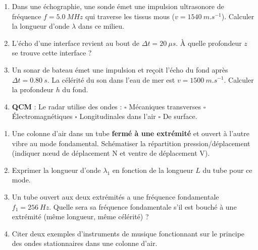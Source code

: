 \documentclass[11pt]{article}
\begin{document}
\begin{exercice}
\begin{enumerate}
    \item Dans une échographie, une sonde émet une impulsion ultrasonore de fréquence $f = \SI{5,0}{MHz}$ qui traverse les tissus mous ($v = \SI{1540}{m.s^{-1}}$). Calculer la longueur d'onde $\lambda$ dans ce milieu.
    \item L'écho d'une interface revient au bout de $\Delta t = \SI{20}{\mu s}$. À quelle profondeur $z$ se trouve cette interface ?
    \item Un sonar de bateau émet une impulsion et reçoit l'écho du fond après $\Delta t = \SI{0,80}{s}$. La célérité du son dans l'eau de mer est $v = \SI{1500}{m.s^{-1}}$. Calculer la profondeur $h$ du fond.
    \item \textbf{QCM} : Le radar utilise des ondes : \quad $\square$ Mécaniques transverses \quad $\square$ Électromagnétiques \quad $\square$ Longitudinales dans l'air \quad $\square$ De surface.
\end{enumerate}
\end{exercice}

\begin{exercice}
\begin{enumerate}
    \item Une colonne d'air dans un tube \textbf{fermé à une extrémité} et ouvert à l'autre vibre au mode fondamental. Schématiser la répartition pression/déplacement (indiquer nœud de déplacement N et ventre de déplacement V).
    \item Exprimer la longueur d'onde $\lambda_1$ en fonction de la longueur $L$ du tube pour ce mode.
    \item Un tube ouvert aux deux extrémités a une fréquence fondamentale $f_1 = \SI{256}{Hz}$. Quelle sera sa fréquence fondamentale s'il est bouché à une extrémité (même longueur, même célérité) ?
    \item Citer deux exemples d'instruments de musique fonctionnant sur le principe des ondes stationnaires dans une colonne d'air.
\end{enumerate}
\end{exercice}
\end{document}

